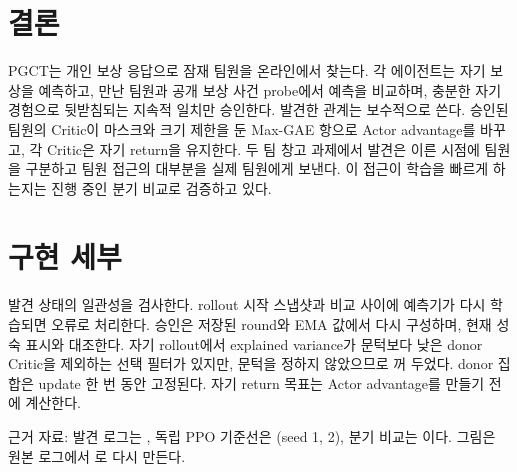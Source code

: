 \documentclass[10pt,twocolumn,letterpaper]{article}
\begin{document}
\section{결론}
PGCT는 개인 보상 응답으로 잠재 팀원을 온라인에서 찾는다. 각 에이전트는 자기 보상을 예측하고, 만난 팀원과 공개 보상 사건 probe에서 예측을 비교하며, 충분한 자기 경험으로 뒷받침되는 지속적 일치만 승인한다. 발견한 관계는 보수적으로 쓴다. 승인된 팀원의 Critic이 마스크와 크기 제한을 둔 Max-GAE 항으로 Actor advantage를 바꾸고, 각 Critic은 자기 return을 유지한다. 두 팀 창고 과제에서 발견은 이른 시점에 팀원을 구분하고 팀원 접근의 대부분을 실제 팀원에게 보낸다. 이 접근이 학습을 빠르게 하는지는 진행 중인 분기 비교로 검증하고 있다.




\appendix
\section{구현 세부}
발견 상태의 일관성을 검사한다. rollout 시작 스냅샷과 비교 사이에 예측기가 다시 학습되면 오류로 처리한다. 승인은 저장된 round와 EMA 값에서 다시 구성하며, 현재 성숙 표시와 대조한다. 자기 rollout에서 explained variance가 문턱보다 낮은 donor Critic을 제외하는 선택 필터가 있지만, 문턱을 정하지 않았으므로 꺼 두었다. donor 집합은 update 한 번 동안 고정된다. 자기 return 목표는 Actor advantage를 만들기 전에 계산한다.

근거 자료: 발견 로그는 , 독립 PPO 기준선은 (seed 1, 2), 분기 비교는 이다. 그림은 원본 로그에서 로 다시 만든다.
\end{document}
